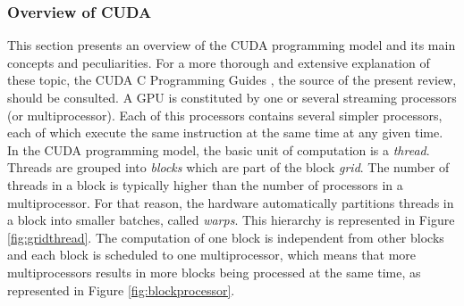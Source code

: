 





\subsubsection{Overview of CUDA}


This section presents an overview of the CUDA programming model and its main concepts and peculiarities.
For a more thorough and extensive explanation of these topic, the CUDA C Programming Guides \cite{Nvidia2014}, the source of the present review, should be consulted.
A GPU is constituted by one or several streaming processors (or multiprocessor).
Each of this processors contains several simpler processors, each of which execute the same instruction at the same time at any given time.
In the CUDA programming model, the basic unit of computation is a \emph{thread}.
Threads are grouped into \emph{blocks} which are part of the block \emph{grid}.
The number of threads in a block is typically higher than the number of processors in a multiprocessor.
For that reason, the hardware automatically partitions threads in a block into smaller batches, called \emph{warps}.
This hierarchy is represented in Figure \ref{fig:gridthread}.
The computation of one block is independent from other blocks and each block is scheduled to one multiprocessor, which means that more multiprocessors results in more blocks being processed at the same time, as represented in Figure \ref{fig:blockprocessor}.


